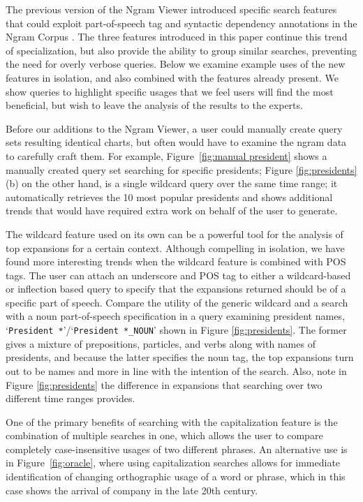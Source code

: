 \documentclass[11pt,a4paper]{article}
\newcommand{\query}[1]{\texttt{#1}}
\begin{document}
The previous version of the Ngram Viewer introduced specific search features that could exploit part-of-speech tag and syntactic dependency annotations in the Ngram Corpus \cite{lin2012syntactic}. The three features introduced in this paper continue this trend of specialization, but also provide the ability to group similar searches, preventing the need for overly verbose queries. Below we examine example uses of the new features in isolation, and also combined with the features already present. We show queries to highlight specific usages that we feel users will find the most beneficial, but wish to leave the analysis of the results to the experts.

Before our additions to the Ngram Viewer, a user could manually create query sets resulting identical charts, but often would have to examine the ngram data to carefully craft them. For example, Figure~\ref{fig:manual president} shows a manually created query set searching for specific presidents; Figure \ref{fig:presidents}(b) on the other hand, is a single wildcard query over the same time range; it automatically retrieves the 10 most popular presidents and shows additional trends that would have required extra work on behalf of the user to generate.

The wildcard feature used on its own can be a powerful tool for the analysis of top expansions for a certain context.  Although compelling in isolation, we have found more interesting trends when the wildcard feature is combined with POS tags. The user can attach an underscore and POS tag to either a wildcard-based or inflection based query to specify that the expansions returned should be of a specific part of speech. Compare the utility of the generic wildcard and a search with a noun part-of-speech specification in a query examining president names, `\query{President *}'/`\query{President *\_NOUN}' shown in Figure \ref{fig:presidents}. The former gives a mixture of prepositions, particles, and verbs along with names of presidents, and because the latter specifies the noun tag, the top expansions turn out to be names and more in line with the intention of the search. Also, note in Figure \ref{fig:presidents} the difference in expansions that searching over two different time ranges provides.

One of the primary benefits of searching with the capitalization feature is the combination of multiple searches in one, which allows the user to compare completely case-insensitive usages of two different phrases. An alternative use is in Figure~\ref{fig:oracle}, where using capitalization searches allows for immediate identification of changing orthographic usage of a word or phrase, which in this case shows the arrival of company in the late 20th century.
\end{document}
